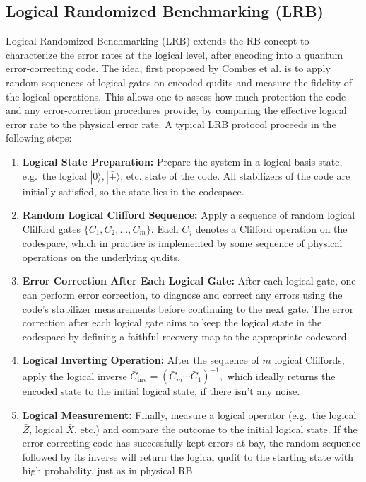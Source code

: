 \subsection{Logical Randomized Benchmarking (LRB)}

Logical Randomized Benchmarking (LRB) extends the RB concept to characterize the error rates at the logical level, after encoding into a quantum error-correcting code. The idea, first proposed by Combes et al. \cite{Combes2017} is to apply random sequences of logical gates on encoded qudits and measure the fidelity of the logical operations. This allows one to assess how much protection the code and any error-correction procedures provide, by comparing the effective logical error rate to the physical error rate. A typical LRB protocol proceeds in the following steps:
\begin{enumerate}
  \item \textbf{Logical State Preparation:}
  Prepare the system in a logical basis state, e.g.\ the logical
  $|\bar{0}\rangle, |\bar{+}\rangle$, etc. state of the code. All stabilizers of the
  code are initially satisfied, so the state lies in the codespace.

  \item \textbf{Random Logical Clifford Sequence:}
  Apply a sequence of random logical Clifford gates \newline $\{\bar{C}_1, \bar{C}_2, \dots, \bar{C}_m\}$. Each $\bar{C}_j$ denotes a Clifford operation on the codespace, which
  in practice is implemented by some sequence of physical operations on
  the underlying qudits.

  \item \textbf{Error Correction After Each Logical Gate:}
  After each logical gate, one can perform error correction, to diagnose and correct any errors using the code’s stabilizer
  measurements before continuing to the next gate. The error correction
  after each logical gate aims to keep the logical state in the
  codespace by defining a faithful recovery map to the appropriate
  codeword.

  \item \textbf{Logical Inverting Operation:}
  After the sequence of $m$ logical Cliffords, apply the logical inverse
  $
    \bar{C}_{\text{inv}} = (\bar{C}_m \cdots \bar{C}_1)^{-1},
  $
  which ideally returns the encoded state to the initial logical state, if there isn't any noise.

  \item \textbf{Logical Measurement:}
  Finally, measure a logical operator (e.g.\ the logical $\bar Z$, logical $\bar X$, etc.) and compare
  the outcome to the initial logical state. If the error-correcting code
  has successfully kept errors at bay, the random sequence followed by
  its inverse will return the logical qudit to the starting state with
  high probability, just as in physical RB.


\end{enumerate}

